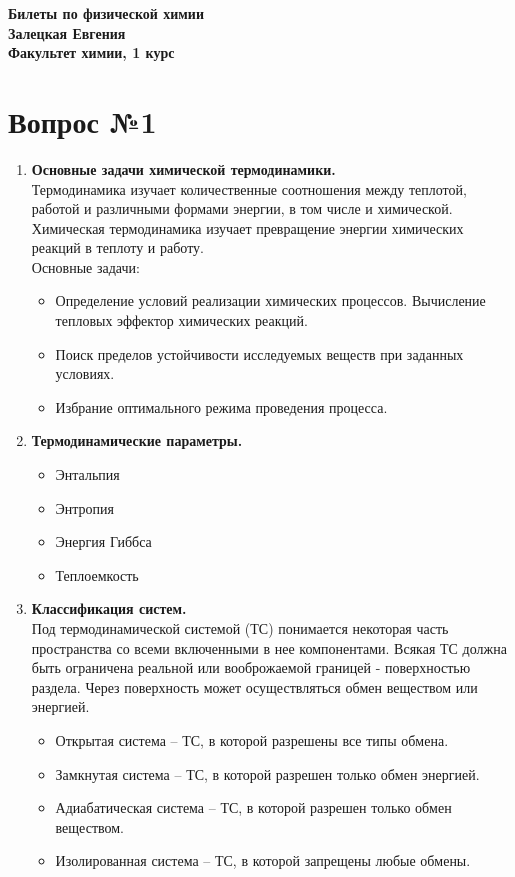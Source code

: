 \documentclass[14pt,a4paper]{scrartcl}
\begin{document}
	\begin{flushright}
	\textbf{Билеты по физической химии\\
		Залецкая Евгения \\
		Факультет химии, 1 курс}
\end{flushright}  	

\section*{Вопрос №1}
	\begin{enumerate}[label=\arabic*)]
		\item \textbf{Основные задачи химической термодинамики.} \\
		Термодинамика изучает количественные соотношения между
		теплотой, работой и различными формами энергии, в том числе
		и химической. \\
		Химическая термодинамика изучает превращение энергии
		химических реакций в теплоту и работу. \\
		Основные задачи:
		\begin{itemize}
			\item Определение условий реализации химических процессов. Вычисление тепловых эффектор химических реакций.
			\item Поиск пределов устойчивости исследуемых веществ при заданных условиях.
			\item Избрание оптимального режима проведения процесса.	
		\end{itemize}
	
		\item \textbf{Термодинамические параметры.} \\
		\begin{itemize}
			\item Энтальпия
			\item Энтропия
			\item Энергия Гиббса
			\item Теплоемкость
		\end{itemize}
	
		\item \textbf{Классификация систем.} \\
		Под термодинамической системой (ТС) понимается некоторая часть пространства со всеми включенными в нее компонентами. Всякая ТС должна быть ограничена реальной или вооброжаемой границей - поверхностью раздела. Через поверхность может осуществляться обмен веществом или энергией.
		\begin{itemize}
			\item Открытая система -- ТС, в которой разрешены все типы обмена.
			\item Замкнутая система -- ТС, в которой разрешен только обмен энергией.
			\item Адиабатическая система -- ТС, в которой разрешен только обмен веществом.
			\item Изолированная система -- ТС, в которой запрещены любые обмены.
		\end{itemize}
	

\end{enumerate}
\end{document}
